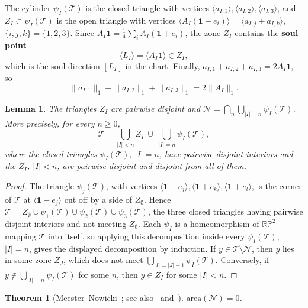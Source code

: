 \documentclass[11pt]{amsart}
\newtheorem{lettertheorem}{Theorem}%
\newtheorem{lemma}[proposition]{Lemma}
\theoremstyle{definition}
\theoremstyle{remark}
\newcommand{\one}{\mathbf 1}
\newcommand{\RP}{\mathbb{RP}}
\newcommand{\cN}{\mathcal N}
\newcommand{\cT}{\mathcal T}
\newcommand{\abs}[1]{\lvert #1\rvert}
\newcommand{\norm}[1]{\lVert #1\rVert}
\newcommand{\pr}[1]{\langle #1\rangle}
\begin{document}
The cylinder $\psi_I(\cT)$ is the closed triangle with vertices $\pr{a_{I,1}},\pr{a_{I,2}},\pr{a_{I,3}}$, and $Z_I\subset\psi_I(\cT)$ is the open triangle with vertices $\pr{A_I(\one+e_i)}=\pr{a_{I,j}+a_{I,k}}$, $\{i,j,k\}=\{1,2,3\}$. Since $A_I\one=\frac14\sum_iA_I(\one+e_i)$, the zone $Z_I$ contains the \textbf{soul point}
\[
  \pr{L_I}=\pr{A_I\one}\in Z_I ,
\]
which is the soul direction $[L_I]$ in the chart. Finally, $a_{I,1}+a_{I,2}+a_{I,3}=2A_I\one$, so
\[
  \norm{a_{I,1}}_1+\norm{a_{I,2}}_1+\norm{a_{I,3}}_1=2\norm{A_I}_1 .
\]

\begin{lemma}\label{lem:zones}
    The triangles $Z_I$ are pairwise disjoint and $\cN=\bigcap_n\bigcup_{\abs I=n}\psi_I(\cT)$. More precisely, for every $n\ge0$,
\[
  \cT=\bigcup_{\abs I<n}Z_I\ \cup\ \bigcup_{\abs I=n}\psi_I(\cT),
\]
where the closed triangles $\psi_I(\cT)$, $\abs I=n$, have pairwise disjoint interiors and the $Z_I$, $\abs I<n$, are pairwise disjoint and disjoint from all of them.
\end{lemma}

\begin{proof}
    The triangle $\psi_j(\cT)$, with vertices $\pr{\one-e_j},\pr{\one+e_k},\pr{\one+e_l}$, is the corner of $\cT$ at $\pr{\one-e_j}$ cut off by a side of $Z_\emptyset$.
    Hence $\cT=Z_\emptyset\cup\psi_1(\cT)\cup\psi_2(\cT)\cup\psi_3(\cT)$, the three closed triangles having pairwise disjoint interiors and not meeting $Z_\emptyset$.
    Each $\psi_I$ is a homeomorphism of $\RP^2$ mapping $\cT$ into itself, so applying this decomposition inside every $\psi_I(\cT)$, $\abs I=n$, gives the displayed decomposition by induction. If $y\in\cT\setminus\cN$, then $y$ lies in some zone $Z_J$, which does not meet $\bigcup_{\abs I=\abs J+1}\psi_I(\cT)$. Conversely, if $y\notin\bigcup_{\abs I=n}\psi_I(\cT)$ for some $n$, then $y\in Z_I$ for some $\abs I<n$.
\end{proof}

\begin{lettertheorem}[Meester--Nowicki~{\cite[Thm.~5.1]{MN89}}; see also~{\cite[Lemme~V.9]{Lev93}} and~{\cite[Thm.~2]{DD09}}]\label{thm:yoccoz}
$\mathrm{area}(\cN)=0$.
\end{lettertheorem}
\end{document}
